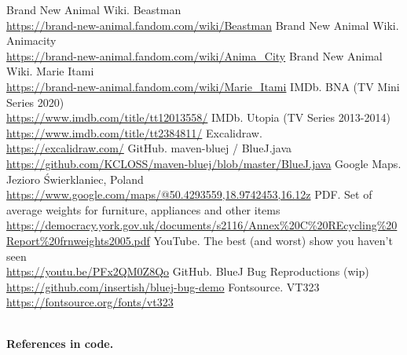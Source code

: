 \documentclass{article}
\begin{document}
    \begin{thebibliography}{9}
        Brand New Animal Wiki. Beastman \\
        \url{https://brand-new-animal.fandom.com/wiki/Beastman}
        Brand New Animal Wiki. Animacity \\
        \url{https://brand-new-animal.fandom.com/wiki/Anima_City}
        Brand New Animal Wiki. Marie Itami \\
        \url{https://brand-new-animal.fandom.com/wiki/Marie_Itami}
        IMDb. BNA (TV Mini Series 2020) \\
        \url{https://www.imdb.com/title/tt12013558/}
        IMDb. Utopia (TV Series 2013-2014) \\
        \url{https://www.imdb.com/title/tt2384811/}
        Excalidraw. \\
        \url{https://excalidraw.com/}
        GitHub. maven-bluej / BlueJ.java \\
        \url{https://github.com/KCLOSS/maven-bluej/blob/master/BlueJ.java}
        Google Maps. Jezioro Świerklaniec, Poland \\
        \url{https://www.google.com/maps/@50.4293559,18.9742453,16.12z}
        PDF. Set of average weights for furniture, appliances and other items \url{https://democracy.york.gov.uk/documents/s2116/Annex\%20C\%20REcycling\%20Report\%20frnweights2005.pdf}
        YouTube. The best (and worst) show you haven't seen \\ \url{https://youtu.be/PFx2QM0Z8Qo}
        GitHub. BlueJ Bug Reproductions (wip) \\ \url{https://github.com/insertish/bluej-bug-demo}
        Fontsource. VT323 \\ \url{https://fontsource.org/fonts/vt323}

        \textbf{\\ References in code.}


\end{thebibliography}
\end{document}
